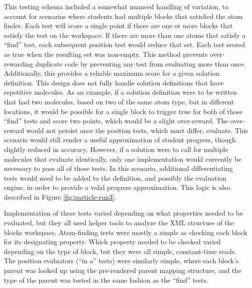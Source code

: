 This testing schema included a somewhat nuanced handling of variation, to account for scenarios where students had multiple blocks that satisfied the atom finder. Each test will score a single point if there are one or more blocks that satisfy the test on the workspace. If there are more than one atoms that satisfy a ``find'' test, each subsequent position test would reduce that set. Each test scored as true when the resulting set was non-empty. This method prevents over-rewarding duplicate code by preventing any test from evaluating more than once. Additionally, this provides a reliable maximum score for a given solution definition. This design does not fully handle solution definitions that have repetitive molecules. As an example, if a solution definition were to be written that had two molecules, based on two of the same atom type, but in different locations, it would be possible for a single block to trigger true for both of those ``find'' tests and score two points, which would be a slight over-reward. The over-reward would not persist once the position tests, which must differ, evaluate. This scenario would still render a useful approximation of student progress, though slightly reduced in accuracy. However, if a solution were to call for multiple molecules that evaluate identically, only one implementation would currently be necessary to pass all of those tests. In this scenario, additional differentiating tests would need to be added to the definition, and possibly the evaluation engine, in order to provide a valid progress approximation. 
This logic is also described in Figure \ref{fig:particle-run3}. 

Implementation of these tests varied depending on what properties needed to be evaluated, but they all used helper tools to analyze the XML structure of the blocks workspace. Atom-finding tests were mostly a simple as checking each block for its designating property. Which property needed to be checked varied depending on the type of block, but they were all simple, constant-time reads. The position evaluators (``in a'' tests) were similarly simple, where each block's parent was looked up using the pre-rendered parent mapping structure, and the type of the parent was tested in the same fashion as the ``find'' tests. 


